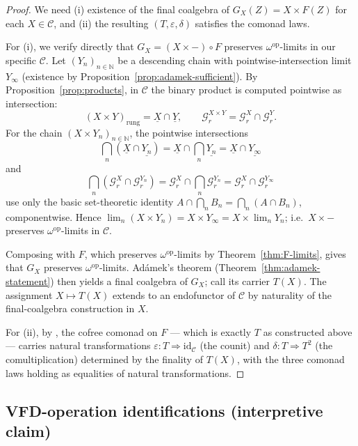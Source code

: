 \documentclass[11pt, a4paper]{amsart}
\theoremstyle{definition}
\newcommand{\N}{\mathbb{N}}
\newcommand{\catC}{\mathcal{C}}
\newcommand{\Gcal}{\mathcal{G}}
\begin{document}
\begin{proof}
We need (i) existence of the final coalgebra of $G_X(Z) = X
\times F(Z)$ for each $X \in \catC$, and (ii) the resulting
$(T, \varepsilon, \delta)$ satisfies the comonad laws.

For (i), we verify directly that $G_X = (X \times -) \circ F$
preserves $\omega^{\mathrm{op}}$-limits in our specific $\catC$.
Let $(Y_n)_{n \in \N}$ be a descending chain with
pointwise-intersection limit $Y_\infty$ (existence by
Proposition~\ref{prop:adamek-sufficient}). By
Proposition~\ref{prop:products}, in $\catC$ the binary product
is computed pointwise as intersection:
\[
    (X \times Y)_{\mathrm{rung}} = \underline{X} \cap
    \underline{Y}, \qquad
    \Gcal_r^{X \times Y} = \Gcal_r^X \cap \Gcal_r^Y.
\]
For the chain $(X \times Y_n)_{n \in \N}$, the pointwise
intersections
\[
    \bigcap_n (\underline{X} \cap \underline{Y_n})
    = \underline{X} \cap \bigcap_n \underline{Y_n}
    = \underline{X} \cap \underline{Y_\infty}
\]
and
\[
    \bigcap_n (\Gcal_r^X \cap \Gcal_r^{Y_n})
    = \Gcal_r^X \cap \bigcap_n \Gcal_r^{Y_n}
    = \Gcal_r^X \cap \Gcal_r^{Y_\infty}
\]
use only the basic set-theoretic identity $A \cap \bigcap_n
B_n = \bigcap_n (A \cap B_n)$, componentwise. Hence $\lim_n
(X \times Y_n) = X \times Y_\infty = X \times \lim_n Y_n$; i.e.\
$X \times -$ preserves $\omega^{\mathrm{op}}$-limits in $\catC$.

Composing with $F$, which preserves
$\omega^{\mathrm{op}}$-limits by Theorem~\ref{thm:F-limits},
gives that $G_X$ preserves $\omega^{\mathrm{op}}$-limits.
Ad\'amek's theorem (Theorem~\ref{thm:adamek-statement}) then
yields a final coalgebra of $G_X$; call its carrier $T(X)$. The
assignment $X \mapsto T(X)$ extends to an endofunctor of
$\catC$ by naturality of the final-coalgebra construction in
$X$.

For (ii), by \cite[Prop.~3.5.7, Cor.~3.5.8]{Jacobs2017}, the
cofree comonad on $F$ — which is exactly $T$ as constructed
above — carries natural transformations $\varepsilon \colon T
\Rightarrow \mathrm{id}_\catC$ (the counit) and $\delta \colon
T \Rightarrow T^2$ (the comultiplication) determined by the
finality of $T(X)$, with the three comonad laws holding as
equalities of natural transformations.
\end{proof}

\subsection{VFD-operation identifications (interpretive claim)}
\end{document}
